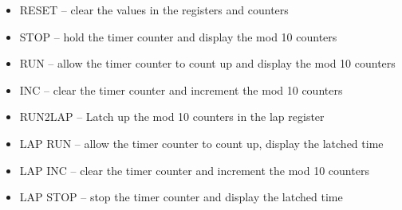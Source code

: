 \begin{itemize}
\item
  RESET -- clear the values in the registers and counters
\item
  STOP -- hold the timer counter and display the mod 10 counters
\item
  RUN -- allow the timer counter to count up and display the mod 10
  counters
\item
  INC -- clear the timer counter and increment the mod 10 counters
\item
  RUN2LAP -- Latch up the mod 10 counters in the lap register
\item
  LAP RUN -- allow the timer counter to count up, display the latched
  time
\item
  LAP INC -- clear the timer counter and increment the mod 10 counters
\item
  LAP STOP -- stop the timer counter and display the latched time
\end{itemize}

